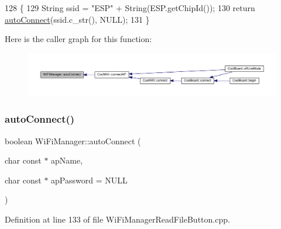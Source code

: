 \begin{DoxyCode}
128                                  \{
129   String ssid = \textcolor{stringliteral}{"ESP"} + String(ESP.getChipId());
130   \textcolor{keywordflow}{return} \hyperlink{class_wi_fi_manager_ae3cdfa6b02edcfe63d7da4f696b62136}{autoConnect}(ssid.c\_str(), NULL);
131 \}
\end{DoxyCode}
Here is the caller graph for this function\+:\nopagebreak
\begin{figure}[H]
\begin{center}
\leavevmode
\includegraphics[width=350pt]{d4/dc8/class_wi_fi_manager_ae3cdfa6b02edcfe63d7da4f696b62136_icgraph}
\end{center}
\end{figure}
\mbox{\label{class_wi_fi_manager_ab1d094034e5e3e36e2e1b3624edad469}} 
\subsubsection{\texorpdfstring{auto\+Connect()}{autoConnect()}\hspace{0.1cm}{\footnotesize\ttfamily [2/2]}}
{\footnotesize\ttfamily boolean Wi\+Fi\+Manager\+::auto\+Connect (\begin{DoxyParamCaption}\item[{char const $\ast$}]{ap\+Name,  }\item[{char const $\ast$}]{ap\+Password = {\ttfamily NULL} }\end{DoxyParamCaption})}



Definition at line 133 of file Wi\+Fi\+Manager\+Read\+File\+Button.\+cpp.


